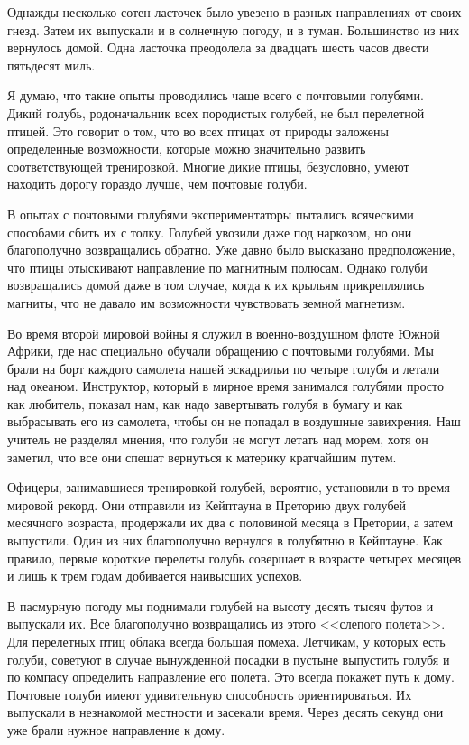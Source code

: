 \documentclass[12pt,a4paper,twoside,openany,svgnames]{memoir}
\begin{document}
Однажды несколько сотен ласточек было увезено в разных направлениях от своих гнезд. Затем их выпускали и в солнечную погоду, и в туман. Большинство из них вернулось домой. Одна ласточка преодолела за двадцать шесть часов двести пятьдесят миль.

Я думаю, что такие опыты проводились чаще всего с почтовыми голубями. Дикий голубь, родоначальник всех породистых голубей, не был перелетной птицей. Это говорит о том, что во всех птицах от природы заложены определенные возможности, которые можно значительно развить соответствующей тренировкой. Многие дикие птицы, безусловно, умеют находить дорогу гораздо лучше, чем почтовые голуби.

В опытах с почтовыми голубями экспериментаторы пытались всяческими способами сбить их с толку. Голубей увозили даже под наркозом, но они благополучно возвращались обратно. Уже давно было высказано предположение, что птицы отыскивают направление по магнитным полюсам. Однако голуби возвращались домой даже в том случае, когда к их крыльям прикреплялись магниты, что не давало им возможности чувствовать земной магнетизм.

Во время второй мировой войны я служил в военно-воздушном флоте Южной Африки, где нас специально обучали обращению с почтовыми голубями. Мы брали на борт каждого самолета нашей эскадрильи по четыре голубя и летали над океаном. Инструктор, который в мирное время занимался голубями просто как любитель, показал нам, как надо завертывать голубя в бумагу и как выбрасывать его из самолета, чтобы он не попадал в воздушные завихрения. Наш учитель не разделял мнения, что голуби не могут летать над морем, хотя он заметил, что все они спешат вернуться к материку кратчайшим путем.

Офицеры, занимавшиеся тренировкой голубей, вероятно, установили в то время мировой рекорд. Они отправили из Кейптауна в Преторию двух голубей месячного возраста, продержали их два с половиной месяца в Претории, а затем выпустили. Один из них благополучно вернулся в голубятню в Кейптауне. Как правило, первые короткие перелеты голубь совершает в возрасте четырех месяцев и лишь к трем годам добивается наивысших успехов.

В пасмурную погоду мы поднимали голубей на высоту десять тысяч футов и выпускали их. Все благополучно возвращались из этого <<слепого полета>>. Для перелетных птиц облака всегда большая помеха. Летчикам, у которых есть голуби, советуют в случае вынужденной посадки в пустыне выпустить голубя и по компасу определить направление его полета. Это всегда покажет путь к дому. Почтовые голуби имеют удивительную способность ориентироваться. Их выпускали в незнакомой местности и засекали время. Через десять секунд они уже брали нужное направление к дому.
\end{document}
